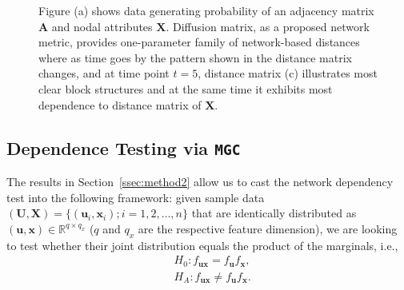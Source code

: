 \documentclass[11pt]{article}
\theoremstyle{definition}
\begin{document}
\begin{figure}[ht]
\begin{subfigure}[b]{0.23\textwidth}
		\caption{}
		\label{fig:d}
	\end{subfigure}
	\caption{Figure (a) shows data generating probability of an adjacency matrix $\mathbf{A}$ and nodal attributes $\mathbf{X}$. Diffusion matrix, as a proposed network metric, provides one-parameter family of network-based distances where as time goes by the pattern shown in the distance matrix changes, and at time point $t = 5$, distance matrix (c) illustrates most clear block structures and at the same time it exhibits most dependence to distance matrix of $\mathbf{X}$.}
	\label{fig:diffusions}
\end{figure}

	\vspace*{-0.4cm}
\subsection{Dependence Testing via \texttt{MGC}}
\label{ssec:method1}
The results in Section~\ref{ssec:method2} allow us to cast the network dependency test into the following framework: given sample data $(\mathbf{U}, \mathbf{X}) = \{  (\mathbf{u}_{i}, \mathbf{x}_{i} ) ; i = 1,2, \ldots, n \}$ that are identically distributed as $(\mathbf{u},\mathbf{x}) \in \mathbb{R}^{q \times q_x}$ ($q$ and $q_x$ are the respective feature dimension), we are looking to test whether their joint distribution equals the product of the marginals, i.e.,
\begin{align*}
& H_{0}: f_{\mathbf{u}\mathbf{x}}=f_{\mathbf{u}}f_{\mathbf{x}},\\
& H_{A}: f_{\mathbf{u}\mathbf{x}}\neq f_{\mathbf{u}}f_{\mathbf{x}}.
\end{align*}
\end{document}
